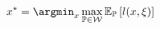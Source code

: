 \documentclass[preview]{standalone}
\begin{document}
\begin{align*}
x^* = \argmin_x \max_{\mathbb{P} \in \mathcal{W}} \mathbb{E}_{\mathbb{P}}\left[l(x, \xi)\right]
\end{align*}
\end{document}
